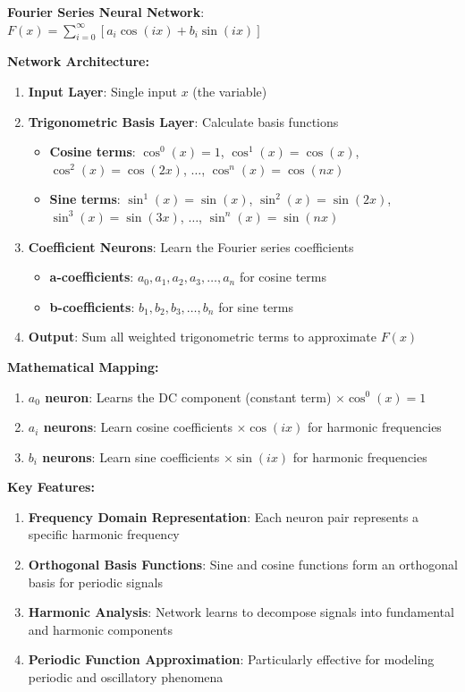 \textbf{Fourier Series Neural Network}: $F(x) = \sum_{i=0}^{\infty} \left[a_i \cos(ix) + b_i \sin(ix)\right]$

\textbf{Network Architecture:}

\begin{enumerate}
\item \textbf{Input Layer}: Single input $x$ (the variable)
\item \textbf{Trigonometric Basis Layer}: Calculate basis functions
\begin{itemize}
\item \textbf{Cosine terms}: $\cos^0(x) = 1$, $\cos^1(x) = \cos(x)$, $\cos^2(x) = \cos(2x)$, $\ldots$, $\cos^n(x) = \cos(nx)$
\item \textbf{Sine terms}: $\sin^1(x) = \sin(x)$, $\sin^2(x) = \sin(2x)$, $\sin^3(x) = \sin(3x)$, $\ldots$, $\sin^n(x) = \sin(nx)$
\end{itemize}
\item \textbf{Coefficient Neurons}: Learn the Fourier series coefficients
\begin{itemize}
\item \textbf{a-coefficients}: $a_0, a_1, a_2, a_3, \ldots, a_n$ for cosine terms
\item \textbf{b-coefficients}: $b_1, b_2, b_3, \ldots, b_n$ for sine terms
\end{itemize}
\item \textbf{Output}: Sum all weighted trigonometric terms to approximate $F(x)$
\end{enumerate}

\textbf{Mathematical Mapping:}

\begin{enumerate}
\item \textbf{$a_0$ neuron}: Learns the DC component (constant term) $\times \cos^0(x) = 1$
\item \textbf{$a_i$ neurons}: Learn cosine coefficients $\times \cos(ix)$ for harmonic frequencies
\item \textbf{$b_i$ neurons}: Learn sine coefficients $\times \sin(ix)$ for harmonic frequencies
\end{enumerate}

\textbf{Key Features:}

\begin{enumerate}
\item \textbf{Frequency Domain Representation}: Each neuron pair represents a specific harmonic frequency
\item \textbf{Orthogonal Basis Functions}: Sine and cosine functions form an orthogonal basis for periodic signals
\item \textbf{Harmonic Analysis}: Network learns to decompose signals into fundamental and harmonic components
\item \textbf{Periodic Function Approximation}: Particularly effective for modeling periodic and oscillatory phenomena
\end{enumerate}

